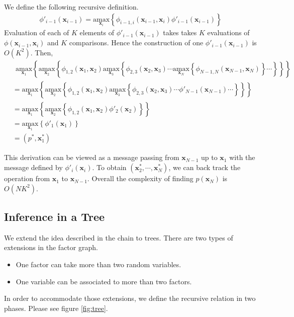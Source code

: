 \documentclass[a4]{article}
\begin{document}
We define the following recursive definition.
\begin{equation}
\begin{aligned}
\phi'_{i-1}(\bm{x}_{i-1}) = 
\underset{\bm{x}_{i}}{\mathrm{amax}}\left\{
\phi_{i-1,i}(\bm{x}_{i-1}, \bm{x}_{i})\phi'_{i-1}(\bm{x}_{i-1})\right\}
\end{aligned}
\end{equation}
Evaluation of each of $K$ elements of $\phi'_{i-1}(\bm{x}_{i-1})$ takes 
takes $K$ evaluations of $\phi(\bm{x}_{i-1},\bm{x}_{i})$ and 
$K$ comparisons. Hence the construction of one $\phi'_{i-1}(\bm{x}_{i-1})$ is $O(K^2)$.
Then,
\begin{equation}
\begin{aligned}
&\:\:
\underset{\bm{x}_1}{\mathrm{amax}}\left\{
\underset{\bm{x}_2}{\mathrm{amax}}\left\{
\phi_{1,2}(\bm{x}_1,\bm{x}_2)
\underset{\bm{x}_3}{\mathrm{amax}}\left\{
\phi_{2,3}(\bm{x}_2,\bm{x}_3)
\cdots
\underset{\bm{x}_N}{\mathrm{amax}}\left\{
\phi_{N-1,N}(\bm{x}_{N-1},\bm{x}_{N})
\right\}\cdots
\right\}
\right\}
\right\}\\
&=
\underset{\bm{x}_1}{\mathrm{amax}}\left\{
\underset{\bm{x}_2}{\mathrm{amax}}\left\{
\phi_{1,2}(\bm{x}_1,\bm{x}_2)
\underset{\bm{x}_3}{\mathrm{amax}}\left\{
\phi_{2,3}(\bm{x}_2,\bm{x}_3)
\cdots
\phi'_{N-1}(\bm{x}_{N-1})
\cdots
\right\}
\right\}
\right\}\\
&=
\underset{\bm{x}_1}{\mathrm{amax}}\left\{
\underset{\bm{x}_2}{\mathrm{amax}}\left\{
\phi_{1,2}(\bm{x}_1,\bm{x}_2)
\phi'_{2}(\bm{x}_{2})
\right\}
\right\}\\
&=
\underset{\bm{x}_1}{\mathrm{amax}}\left\{
\phi'_{1}(\bm{x}_{1})
\right\}\\
&=
(p^*, \bm{x}^*_1)
\end{aligned}
\end{equation}

This derivation can be viewed as a message passing from $\bm{x}_{N-1}$ up to $\bm{x}_1$ with the message defined by 
$\phi'_{i}(\bm{x}_{i})$.
To obtain $(\bm{x}^*_2, \cdots, \bm{x}^*_N)$, we can back track the operation from $\bm{x}_1$ to $\bm{x}_{N-1}$.
Overall the complexity of finding  $p(\bm{x}_{N})$ is $O(NK^2)$.

\subsection{Inference in a Tree}
We extend the idea described in the chain to trees.
There are two types of extensions in the factor graph.
\begin{itemize}
\item One factor can take more than two random variables.
\item One variable can be associated to more than two factors.
\end{itemize}
In order to accommodate those extensions, we define the recursive relation in two phases.
Please see figure \ref{fig:tree}.
\end{document}
